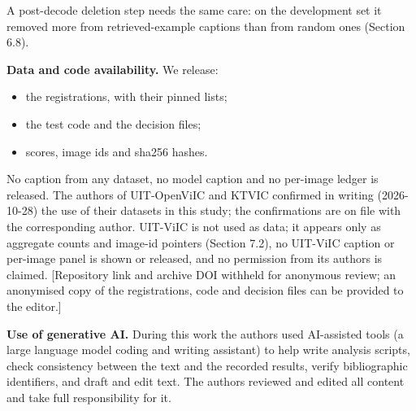 A post-decode deletion step needs the same care: on the development set it removed more from
retrieved-example captions than from random ones (Section 6.8).

\textbf{Data and code availability.} We release:

\begin{itemize}
\tightlist
\item
  the registrations, with their pinned lists;
\item
  the test code and the decision files;
\item
  scores, image ids and sha256 hashes.
\end{itemize}

No caption from any dataset, no model caption and no per-image ledger is released. The authors of
UIT-OpenViIC and KTVIC confirmed in writing (2026-10-28) the use of their datasets in this study;
the confirmations are on file with the corresponding author. UIT-ViIC is not used as data; it
appears only as aggregate counts and image-id pointers (Section 7.2), no UIT-ViIC caption or
per-image panel is shown or released, and no permission from its authors is claimed. {[}Repository
link and archive DOI withheld for anonymous review; an anonymised copy of the registrations, code
and decision files can be provided to the editor.{]}

\begin{acks}
\textbf{Use of generative AI.} During this work the authors used AI-assisted tools (a large language
model coding and writing assistant) to help write analysis scripts, check consistency between the
text and the recorded results, verify bibliographic identifiers, and draft and edit text. The
authors reviewed and edited all content and take full responsibility for it.
\end{acks}
